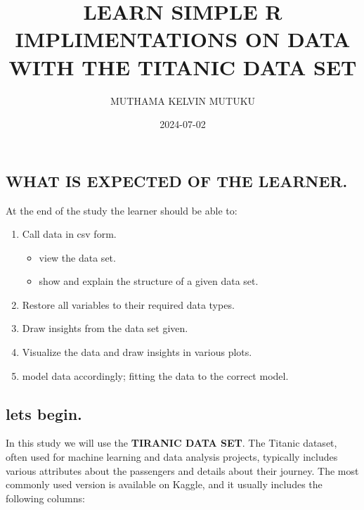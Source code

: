 \documentclass[
]{article}
\title{LEARN SIMPLE R IMPLIMENTATIONS ON DATA WITH THE TITANIC DATA SET}
\author{MUTHAMA KELVIN MUTUKU}
\date{2024-07-02}
\providecommand{\tightlist}{%
  \setlength{\itemsep}{0pt}\setlength{\parskip}{0pt}}
\begin{document}
\maketitle

{
\setcounter{tocdepth}{2}
\tableofcontents
}
\hypertarget{what-is-expected-of-the-learner.}{%
\subsection{WHAT IS EXPECTED OF THE
LEARNER.}\label{what-is-expected-of-the-learner.}}

At the end of the study the learner should be able to:

\begin{enumerate}
\def\labelenumi{\arabic{enumi}.}
\tightlist
\item
  Call data in csv form.

  \begin{itemize}
  \tightlist
  \item
    view the data set.
  \item
    show and explain the structure of a given data set.
  \end{itemize}
\item
  Restore all variables to their required data types.
\item
  Draw insights from the data set given.
\item
  Visualize the data and draw insights in various plots.
\item
  model data accordingly; fitting the data to the correct model.
\end{enumerate}

\hypertarget{lets-begin.}{%
\subsection{lets begin.}\label{lets-begin.}}

In this study we will use the \textbf{TIRANIC DATA SET}. The Titanic
dataset, often used for machine learning and data analysis projects,
typically includes various attributes about the passengers and details
about their journey. The most commonly used version is available on
Kaggle, and it usually includes the following columns:
\end{document}
